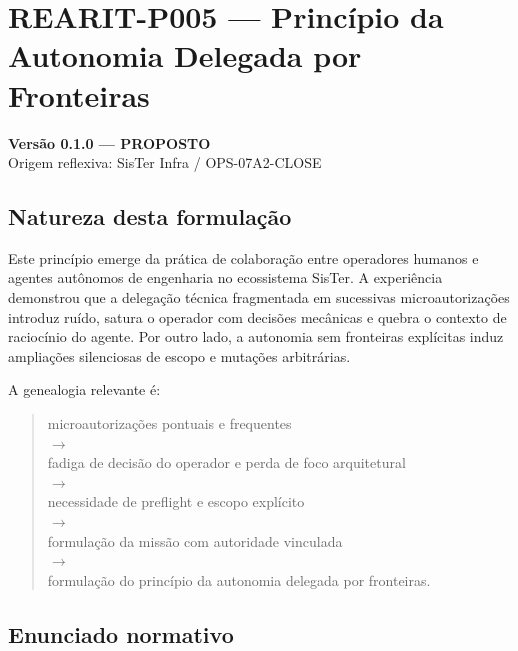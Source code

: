 
\chapter{REARIT-P005 --- Princípio da Autonomia Delegada por Fronteiras}

\begin{center}
\textbf{Versão 0.1.0 --- PROPOSTO}\\
Origem reflexiva: SisTer Infra / OPS-07A2-CLOSE
\end{center}

\section{Natureza desta formulação}

Este princípio emerge da prática de colaboração entre operadores humanos e
agentes autônomos de engenharia no ecossistema SisTer. A experiência demonstrou
que a delegação técnica fragmentada em sucessivas microautorizações introduz
ruído, satura o operador com decisões mecânicas e quebra o contexto de
raciocínio do agente. Por outro lado, a autonomia sem fronteiras explícitas
induz ampliações silenciosas de escopo e mutações arbitrárias.

A genealogia relevante é:

\begin{quote}
microautorizações pontuais e frequentes\\
$\rightarrow$\\
fadiga de decisão do operador e perda de foco arquitetural\\
$\rightarrow$\\
necessidade de preflight e escopo explícito\\
$\rightarrow$\\
formulação da missão com autoridade vinculada\\
$\rightarrow$\\
formulação do princípio da autonomia delegada por fronteiras.
\end{quote}

\section{Enunciado normativo}

